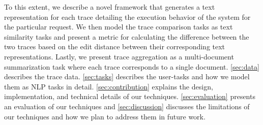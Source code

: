To this extent, we describe a novel framework that generates a text representation
for each trace detailing the execution behavior of the system for the particular request. We then
model the trace comparison tasks as text similarity tasks and present a metric for calculating
the difference between the two traces based on the edit distance between their corresponding text representations.
Lastly, we present trace aggregation as a multi-document summarization task where each trace corresponds
to a single document. \autoref{sec:data} describes the trace data. \autoref{sec:tasks} describes
the user-tasks and how we model them as NLP tasks in detail. \autoref{sec:contribution} explains
the design, implementation, and technical details of our techniques. \autoref{sec:evaluation} presents
an evaluation of our techniques and \autoref{sec:discussion} discusses the limitations of our techniques
and how we plan to address them in future work.
